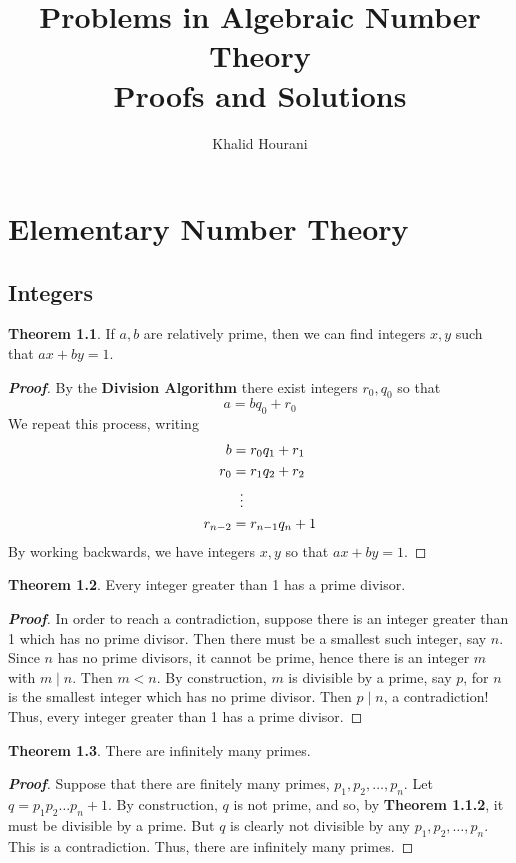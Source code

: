 \documentclass[12pt,leqno]{book}
\title{Problems in Algebraic Number Theory\\Proofs and Solutions}
\date{}
\author{Khalid Hourani}
\numberwithin{equation}{section}
\theoremstyle{definition}
\newtheorem{thm}{Theorem}[section]
\newenvironment{Proof}{\begin{proof}[\textnormal{\textbf{Proof}}]}{\end{proof}}
\begin{document}
\maketitle\thispagestyle{empty}
\tableofcontents\thispagestyle{empty}
\thispagestyle{empty}

\setcounter{page}{0}
\chapter{Elementary Number Theory}
\section{Integers}
\begin{thm}
 If $a,b$ are relatively prime, then we can find integers $x,y$ such that $ax+by=1$. 
\end{thm}

\begin{Proof}
 By the \textbf{Division Algorithm} there exist integers $r_0,q_0$ so that \[a=bq_0+r_0\] We repeat this process, writing \begin{align*}b&=r_0q_1+r_1\\r_0&=r_1q_2+r_2\\&\hskip.08in\vdots\\r_{n-2}&=r_{n-1}q_n+1\end{align*} By working backwards, we have integers $x,y$ so that $ax+by=1$. 
\end{Proof}

\begin{thm}
 Every integer greater than 1 has a prime divisor.
\end{thm}

\begin{Proof}
 In order to reach a contradiction, suppose there is an integer greater than 1 which has no prime divisor. Then there must be a smallest such integer, say $n$. Since $n$ has no prime divisors, it cannot be prime, hence there is an integer $m$ with $m\mid n$. Then $m<n$. By construction, $m$ is divisible by a prime, say $p$, for $n$ is the smallest integer which has no prime divisor. Then $p\mid n$, a contradiction! Thus, every integer greater than 1 has a prime divisor.
\end{Proof}

\begin{thm}
 There are infinitely many primes.
\end{thm}

\begin{Proof}
 Suppose that there are finitely many primes, $p_1,p_2,\hdots,p_n$. Let $q=p_1p_2\hdots p_n+1$. By construction, $q$ is not prime, and so, by \textbf{Theorem 1.1.2}, it must be divisible by a prime. But $q$ is clearly not divisible by any $p_1,p_2,\hdots,p_n$. This is a contradiction. Thus, there are infinitely many primes.
\end{Proof}
\end{document}
